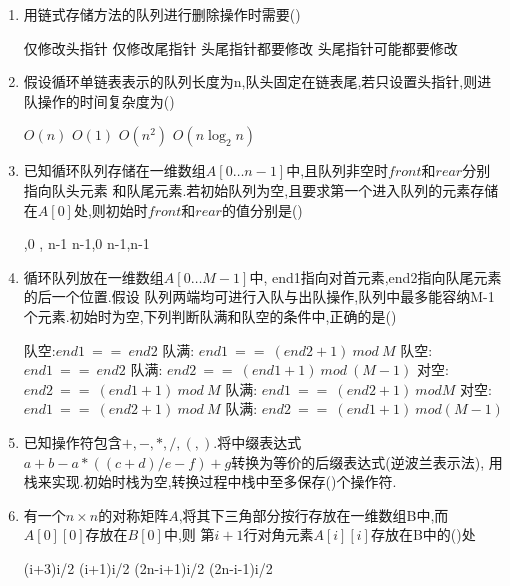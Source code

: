 \documentclass[12pt, a4paper, oneside, UTF8]{ctexbook}
\begin{document}
\begin{enumerate}
    \item 用链式存储方法的队列进行删除操作时需要() 
    \begin{choices}[2]
        \task 仅修改头指针
        \task 仅修改尾指针
        \task 头尾指针都要修改
        \task 头尾指针可能都要修改 
    \end{choices}



    \item 假设循环单链表表示的队列长度为n,队头固定在链表尾,若只设置头指针,则进队操作的时间复杂度为() 
    \begin{choices}
        \task $O(n) $ \task $O(1)$ \task $O(n^2)$ \task $O(n\log_{2}{n})$
    \end{choices}


    \item \bl 已知循环队列存储在一维数组$A[0\ldots n-1]$中,且队列非空时$front$和$rear$分别指向队头元素
    和队尾元素.若初始队列为空,且要求第一个进入队列的元素存储在$A[0]$处,则初始时$front$和$rear$的值分别是() 
    \begin{choices}
        ,0 , n-1 \task n-1,0 \task n-1,n-1
    \end{choices}


    \item 循环队列放在一维数组$A[0\ldots M-1]$中, end1指向对首元素,end2指向队尾元素的后一个位置.假设
    队列两端均可进行入队与出队操作,队列中最多能容纳M-1个元素.初始时为空,下列判断队满和队空的条件中,正确的是() 
    \begin{choices}[1]
        \task 队空:$end1\ ==\ end2$ 队满: $end1\ ==\ (end2+1)\ mod\ M$ 
        \task 队空:$end1\ ==\ end2$ 队满: $end2\ ==\ (end1+1)\ mod\ (M-1)$
        \task 对空:$end2\ ==\ (end1+1)\ mod\ M$ 队满: $end1\ ==\ (end2+1)\ mod M$
        \task 对空:$end1\ ==\ (end2+1)\ mod\ M$ 队满: $end2\ ==\ (end1+1)\ mod (M-1)$
    \end{choices}


    \item \bl 已知操作符包含$+,-,*,/,(,)$.将中缀表达式$a+b-a*((c+d)/e-f)+g$转换为等价的后缀表达式(逆波兰表示法),
    用栈来实现.初始时栈为空,转换过程中栈中至多保存()个操作符. 



    \item \bt 有一个$n\times n$的对称矩阵$A$,将其下三角部分按行存放在一维数组B中,而$A[0][0]$存放在$B[0]$中,则
    第$i+1$行对角元素$A[i][i]$存放在B中的()处 
    \begin{choices}
        \task (i+3)i/2 
        \task (i+1)i/2
        \task (2n-i+1)i/2
        \task (2n-i-1)i/2 
    \end{choices}



\end{enumerate}
\end{document}
